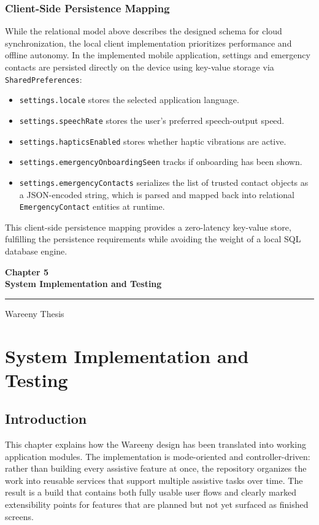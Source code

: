 \documentclass[12pt,a4paper]{report}
\newcommand{\chaptercover}[1]{%
  \clearpage
  \thispagestyle{empty}
  \vspace*{\fill}
  \begin{center}
    {\Huge\bfseries #1\par}
    \vspace{0.8cm}
    \rule{0.35\textwidth}{1pt}\par
    \vspace{0.6cm}
    {\Large Wareeny Thesis\par}
  \end{center}
  \vspace*{\fill}
  \clearpage
}
\begin{document}
\subsection{Client-Side Persistence Mapping}
While the relational model above describes the designed schema for cloud synchronization, the local client implementation prioritizes performance and offline autonomy. In the implemented mobile application, settings and emergency contacts are persisted directly on the device using key-value storage via \texttt{SharedPreferences}:

\begin{itemize}
  \item \texttt{settings.locale} stores the selected application language.
  \item \texttt{settings.speechRate} stores the user's preferred speech-output speed.
  \item \texttt{settings.hapticsEnabled} stores whether haptic vibrations are active.
  \item \texttt{settings.emergencyOnboardingSeen} tracks if onboarding has been shown.
  \item \texttt{settings.emergencyContacts} serializes the list of trusted contact objects as a JSON-encoded string, which is parsed and mapped back into relational \texttt{EmergencyContact} entities at runtime.
\end{itemize}
This client-side persistence mapping provides a zero-latency key-value store, fulfilling the persistence requirements while avoiding the weight of a local SQL database engine.

\chaptercover{Chapter 5\\System Implementation and Testing}
\chapter{System Implementation and Testing}

\section{Introduction}
This chapter explains how the Wareeny design has been translated into working application modules. The implementation is mode-oriented and controller-driven: rather than building every assistive feature at once, the repository organizes the work into reusable services that support multiple assistive tasks over time. The result is a build that contains both fully usable user flows and clearly marked extensibility points for features that are planned but not yet surfaced as finished screens.
\end{document}
